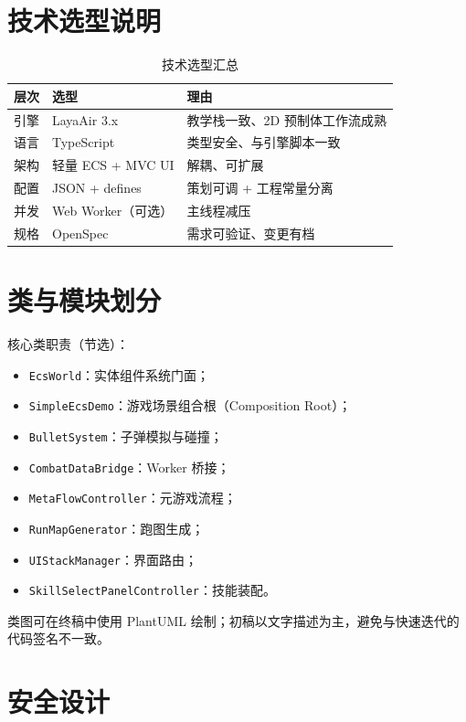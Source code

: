 
\section{技术选型说明}

\begin{table}[htbp]
  \centering
  \caption{技术选型汇总}
  \label{tab:tech-stack}
  \begin{tabular}{lll}
    \toprule
    \textbf{层次} & \textbf{选型} & \textbf{理由} \\
    \midrule
    引擎 & LayaAir 3.x & 教学栈一致、2D 预制体工作流成熟 \\
    语言 & TypeScript & 类型安全、与引擎脚本一致 \\
    架构 & 轻量 ECS + MVC UI & 解耦、可扩展 \\
    配置 & JSON + defines & 策划可调 + 工程常量分离 \\
    并发 & Web Worker（可选） & 主线程减压 \\
    规格 & OpenSpec & 需求可验证、变更有档 \\
    \bottomrule
  \end{tabular}
\end{table}

\section{类与模块划分}

核心类职责（节选）：
\begin{itemize}
  \item \texttt{EcsWorld}：实体组件系统门面；
  \item \texttt{SimpleEcsDemo}：游戏场景组合根（Composition Root）；
  \item \texttt{BulletSystem}：子弹模拟与碰撞；
  \item \texttt{CombatDataBridge}：Worker 桥接；
  \item \texttt{MetaFlowController}：元游戏流程；
  \item \texttt{RunMapGenerator}：跑图生成；
  \item \texttt{UIStackManager}：界面路由；
  \item \texttt{SkillSelectPanelController}：技能装配。
\end{itemize}

类图可在终稿中使用 PlantUML 绘制；初稿以文字描述为主，避免与快速迭代的代码签名不一致。

\section{安全设计}

